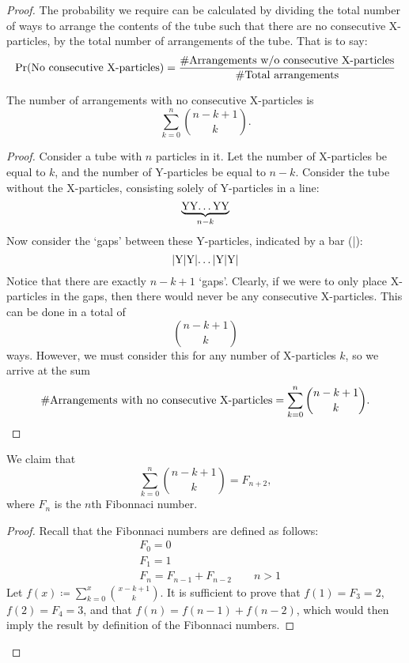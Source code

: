 \begin{proof}
The probability we require can be calculated by dividing the total number of ways to arrange the contents of the tube such that there are no consecutive X-particles, by the total number of arrangements of the tube. That is to say:
\begin{equation*}
  \operatorname{Pr}(\text{No consecutive X-particles}) = \frac{\# \text{Arrangements w/o consecutive X-particles}}{\# \text{Total arrangements}}
\end{equation*}
\begin{claim}
  The number of arrangements with no consecutive X-particles is \[
    \sum_{k=0}^n \binom{n-k+1}{k}.
  \]
\end{claim}
\begin{proof}
  Consider a tube with $n$ particles in it. Let the number of X-particles be equal to $k$, and the number of Y-particles be equal to $n-k$. Consider the tube without the X-particles, consisting solely of Y-particles in a line:
  \begin{equation}
    \underbrace{\text{YY\dots YY}}_{n-k}
  \end{equation}
  Now consider the `gaps' between these Y-particles, indicated by a bar (|):
  \begin{equation}
    \text{|Y|Y|\dots |Y|Y|}
  \end{equation}
  Notice that there are exactly $n-k+1$ `gaps'. Clearly, if we were to only place X-particles in the gaps, then there would never be any consecutive X-particles. This can be done in a total of \[
    \binom{n-k+1}{k}
    \] ways. However, we must consider this for any number of X-particles $k$, so we arrive at the sum \[
    \#\text{Arrangements with no consecutive X-particles} = \sum_{k=0}^n \binom{n-k+1}{k}. \qedhere
  \]
\end{proof}
\begin{claim}
  We claim that \[
    \sum_{k=0}^n \binom{n-k+1}{k} = F_{n+2},
  \] where $F_n$ is the $n$th Fibonnaci number.
\end{claim}
\begin{proof}
  Recall that the Fibonnaci numbers are defined as follows:
  \begin{align*}
    &F_0 = 0 \\
    &F_1 = 1 \\
    &F_n = F_{n-1} + F_{n-2} \qquad n > 1
  \end{align*}
  Let $f(x)\coloneqq \sum_{k=0}^x \binom{x-k+1}{k}$. It is sufficient to prove that $f(1) = F_{3} = 2$, $f(2) = F_{4} = 3$, and that $f(n) = f(n-1) + f(n-2)$, which would then imply the result by definition of the Fibonnaci numbers.


\end{proof}
\end{proof}
